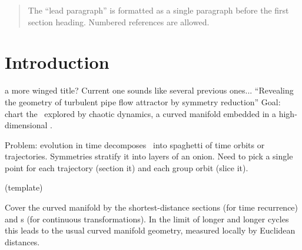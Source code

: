 
\begin{quotation}
    \ifdraft\color{blue}
The ``lead paragraph'' is formatted as a single paragraph before the first
section heading. Numbered references are allowed.
    \color{black}\fi
\end{quotation}


\section{Introduction}
\label{s:intro}

    \ifdraft\color{blue}
a more winged title? Current one sounds like several previous ones...
``Revealing the geometry of turbulent pipe flow attractor by symmetry reduction''
Goal: chart the \statesp\ explored by chaotic dynamics,
a curved manifold embedded in a high-dimensional \statesp.

Problem: evolution in time decomposes \statesp\ into spaghetti of time
orbits or trajectories. Symmetries stratify it into layers of an onion.
Need to pick a single point for each trajectory (section it) and each group orbit
(slice it).

(template)

Cover the curved manifold by the shortest-distance sections (for time
recurrence) and \slice s (for continuous transformations). In the limit of longer
and longer cycles this leads to the usual curved manifold geometry,
measured locally by Euclidean distances.
    \color{black}\fi


